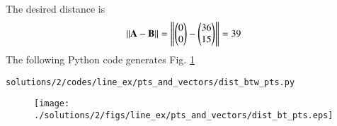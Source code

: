 The desired distance is 
\begin{align}
\left\lVert\mathbf{A} - \mathbf{B}\right\rVert 
=\left\lVert\begin{pmatrix}0\\0\end{pmatrix} - \begin{pmatrix}36\\15\end{pmatrix}\right\rVert = 39
\end{align}
The following Python code generates Fig. \ref{fig:dist_btw_pts2_pts_and_vectors}

\begin{lstlisting}
solutions/2/codes/line_ex/pts_and_vectors/dist_btw_pts.py
\end{lstlisting}


\begin{figure}[!ht]
\centering
\texttt{[image: ./solutions/2/figs/line\_ex/pts\_and\_vectors/dist\_bt\_pts.eps]}
\caption{}
\label{fig:dist_btw_pts2_pts_and_vectors}
\end{figure} 






